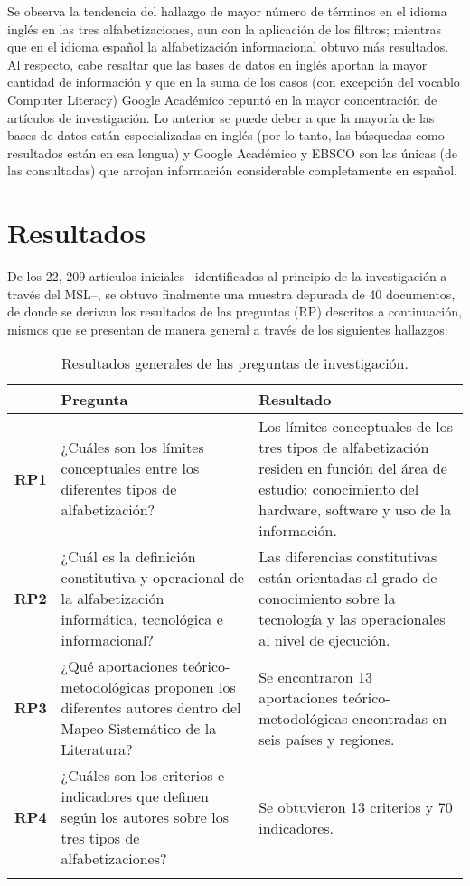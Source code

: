 \documentclass{textolivre}
\begin{document}
Se observa la tendencia del hallazgo de mayor número de términos en el idioma inglés en las tres alfabetizaciones, aun con la aplicación de los filtros; mientras que en el idioma español la alfabetización informacional obtuvo más resultados. Al respecto, cabe resaltar que las bases de datos en inglés aportan la mayor cantidad de información y que en la suma de los casos (con excepción del vocablo Computer Literacy) Google Académico repuntó en la mayor concentración de artículos de investigación. Lo anterior se puede deber a que la mayoría de las bases de datos están especializadas en inglés (por lo tanto, las búsquedas como resultados están en esa lengua) y Google Académico y EBSCO son las únicas (de las consultadas) que arrojan información considerable completamente en español.

\section{Resultados}\label{sec-resultados}
De los 22, 209 artículos iniciales –identificados al principio de la investigación a través del MSL–, se obtuvo finalmente una muestra depurada de 40 documentos, de donde se derivan los resultados de las preguntas (RP) descritos a continuación, mismos que se presentan de manera general a través de los siguientes hallazgos: 

\begin{table}[htpb]
\caption{Resultados generales de las preguntas de investigación.}
\label{tbl06}
\begin{tabular}{lp{6.5cm}p{6.5cm}}
\toprule
 & Pregunta & Resultado \\
\midrule
\arrayrulecolor[gray]{.7}
\textbf{RP1} &
  ¿Cuáles son los límites conceptuales entre los diferentes tipos de alfabetización?  &
  Los límites conceptuales de los tres tipos de alfabetización residen en función del área de estudio: conocimiento del hardware, software y uso de la información.
  \\ \midrule
\textbf{RP2} &
  ¿Cuál es la definición constitutiva y operacional de la alfabetización informática, tecnológica e informacional? &
  Las diferencias constitutivas están orientadas al grado de conocimiento sobre la tecnología y las operacionales al nivel de ejecución.
  \\ \midrule
\textbf{RP3} &
  ¿Qué aportaciones teórico-metodológicas proponen los diferentes autores dentro del Mapeo Sistemático de la Literatura? &
  Se encontraron 13 aportaciones teórico-metodológicas encontradas en seis países y regiones. 
  \\ \midrule
\textbf{RP4} &
  ¿Cuáles son los criterios e indicadores que definen según los autores sobre los tres tipos de alfabetizaciones? &
  Se obtuvieron 13 criterios y 70 indicadores.
  \\ \arrayrulecolor{black}
\bottomrule
\end{tabular}
\end{table}
\end{document}
